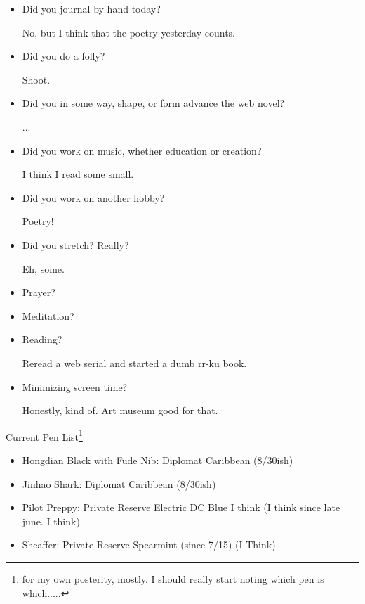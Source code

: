 \documentclass[12pt]{article}
\renewcommand{\,}{\textsuperscript{,}}
\begin{document}
\begin{itemize}

\item Did you journal by hand today?

No, but I think that the poetry yesterday counts.

\item Did you do a folly?

Shoot.
\item Did you in some way, shape, or form advance the web novel?

...

\item Did you work on music, whether education or creation?

I think I read some small.

\item Did you work on another hobby?

Poetry!

\item Did you stretch? Really?

Eh, some.

\item Prayer?

\item Meditation?

\item Reading?

Reread a web serial and started a dumb rr-ku book.

\item Minimizing screen time?

Honestly, kind of.
Art museum good for that.

\end{itemize}

Current Pen List\footnote{for my own posterity, mostly. I should really start noting which pen is which.....}

\begin{itemize}  
\item Hongdian Black with Fude Nib: Diplomat Caribbean (8/30ish)  
\item Jinhao Shark: Diplomat Caribbean (8/30ish)  
\item Pilot Preppy: Private Reserve Electric DC Blue I think (I think since late june. I think)  
\item Sheaffer: Private Reserve Spearmint (since 7/15) (I Think)
\end{itemize}
\end{document}
